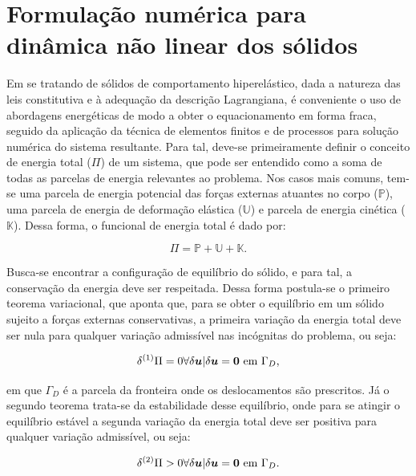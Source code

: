 \chapter{Formulação numérica para dinâmica não linear dos sólidos} \label{EGDS}

Em se tratando de sólidos de comportamento hiperelástico, dada a natureza das leis constitutiva e à adequação da descrição Lagrangiana, é conveniente o uso de abordagens energéticas de modo a obter o equacionamento em forma fraca, seguido da aplicação da técnica de elementos finitos e de processos para solução numérica do sistema resultante. Para tal, deve-se primeiramente definir o conceito de energia total ($\Pi$) de um sistema, que pode ser entendido como a soma de todas as parcelas de energia relevantes ao problema. Nos casos mais comuns, tem-se uma parcela de energia potencial das forças externas atuantes no corpo ($\mathbb{P}$), uma parcela de energia de deformação elástica ($\mathbb{U}$) e parcela de energia cinética ($\mathbb{K}$). Dessa forma, o funcional de energia total é dado por:

\begin{equation}
    \Pi=\mathbb{P}+\mathbb{U}+\mathbb{K}\text{.}
    \label{FuncionalEnergia}
\end{equation}

Busca-se encontrar a configuração de equilíbrio do sólido, e para tal, a conservação da energia deve ser respeitada. Dessa forma postula-se o primeiro teorema variacional, que aponta que, para se obter o equilíbrio em um sólido sujeito a forças externas conservativas, a primeira variação da energia total deve ser nula para qualquer variação admissível nas incógnitas do problema, ou seja:

\begin{equation}
    \delta^{(1)}\Pi=0\forall\delta\boldsymbol{u}|\delta\boldsymbol{u}=\boldsymbol{0}\text{ em }\Gamma_D\text{,}
\end{equation}

\noindent em que $\Gamma_D$ é a parcela da fronteira onde os deslocamentos são prescritos. Já o segundo teorema trata-se da estabilidade desse equilíbrio, onde para se atingir o equilíbrio estável a segunda variação da energia total deve ser positiva para qualquer variação admissível, ou seja:

\begin{equation}
    \delta^{(2)}\Pi>0\forall\delta\boldsymbol{u}|\delta\boldsymbol{u}=\boldsymbol{0}\text{ em }\Gamma_D\text{.}
\end{equation}

